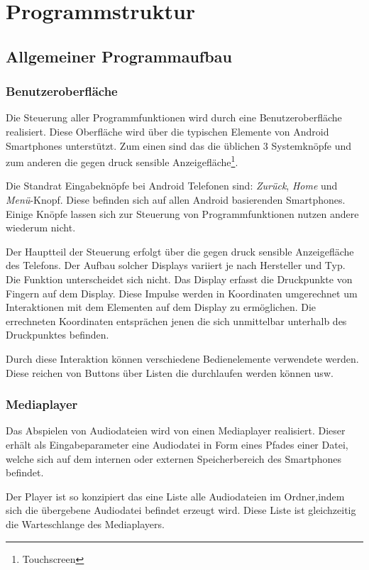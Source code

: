 \section{Programmstruktur}
\subsection{Allgemeiner Programmaufbau}
\subsubsection{Benutzeroberfläche}
Die Steuerung aller Programmfunktionen wird durch eine Benutzeroberfläche realisiert. Diese Oberfläche wird über die typischen Elemente von Android Smartphones unterstützt. Zum einen sind das die üblichen 3 Systemknöpfe und zum anderen die gegen druck sensible Anzeigefläche\footnote{Touchscreen}.

Die Standrat Eingabeknöpfe bei Android Telefonen sind: \textit{Zurück}, \textit{Home} und \textit{Menü}-Knopf. Diese befinden sich auf allen Android basierenden Smartphones. Einige Knöpfe lassen sich zur Steuerung von Programmfunktionen nutzen andere wiederum nicht.

Der Hauptteil der Steuerung erfolgt über die gegen druck sensible Anzeigefläche des Telefons. Der Aufbau solcher Displays variiert je nach Hersteller und Typ. Die Funktion unterscheidet sich nicht. Das Display erfasst die Druckpunkte von Fingern auf dem Display. Diese Impulse werden in Koordinaten umgerechnet um Interaktionen mit dem Elementen auf dem Display zu ermöglichen. Die errechneten Koordinaten entsprächen jenen die sich unmittelbar unterhalb des Druckpunktes befinden.

Durch diese Interaktion können verschiedene Bedienelemente verwendete werden. Diese reichen von Buttons über Listen die durchlaufen werden können usw.

\subsubsection{Mediaplayer}
Das Abspielen von Audiodateien wird von einen Mediaplayer realisiert. Dieser erhält als Eingabeparameter eine Audiodatei in Form eines Pfades einer Datei, welche sich auf dem internen oder externen Speicherbereich des Smartphones befindet. 

Der Player ist so konzipiert das eine Liste alle Audiodateien im Ordner,indem sich die übergebene Audiodatei befindet erzeugt wird. Diese Liste ist gleichzeitig die Warteschlange des Mediaplayers.


